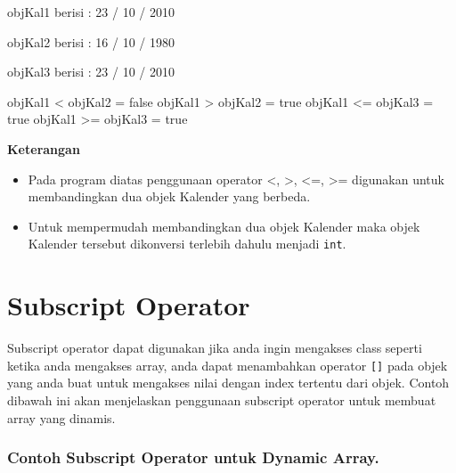 \begin{lcverbatim}
objKal1 berisi :
23 / 10 / 2010

objKal2 berisi :
16 / 10 / 1980

objKal3 berisi :
23 / 10 / 2010

objKal1 < objKal2 = false
objKal1 > objKal2 = true
objKal1 <= objKal3 = true
objKal1 >= objKal3 = true
\end{lcverbatim}

\textbf{Keterangan}

\begin{itemize}
\tightlist
\item
  Pada program diatas penggunaan operator \textless{}, \textgreater{},
  \textless{}=, \textgreater{}= digunakan untuk membandingkan dua objek
  Kalender yang berbeda.
\item
  Untuk mempermudah membandingkan dua objek Kalender maka objek Kalender
  tersebut dikonversi terlebih dahulu menjadi \texttt{int}.
\end{itemize}

\section{Subscript Operator}\label{subscript-operator}

Subscript operator dapat digunakan jika anda ingin mengakses class
seperti ketika anda mengakses array, anda dapat menambahkan operator
\texttt{{[}{]}} pada objek yang anda buat untuk mengakses nilai dengan
index tertentu dari objek. Contoh dibawah ini akan menjelaskan
penggunaan subscript operator untuk membuat array yang dinamis.

\subsubsection*{Contoh  Subscript Operator untuk Dynamic Array.}

